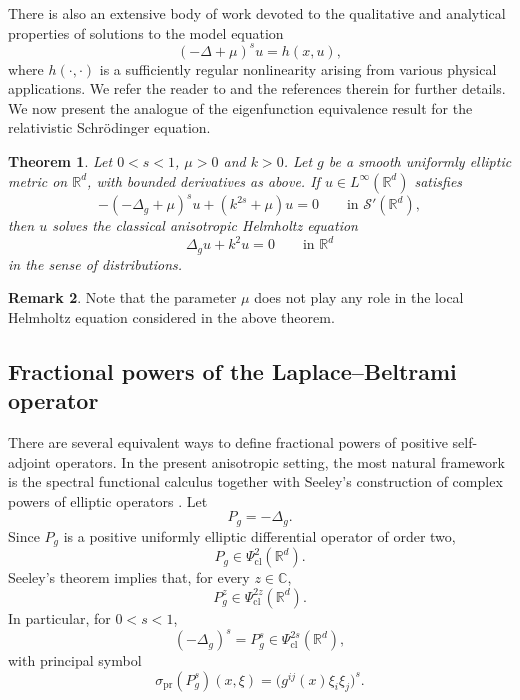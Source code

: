 \documentclass[12pt]{amsart}
\numberwithin{equation}{section}
\newtheorem{thm}{Theorem}[section]
\theoremstyle{definition}
\newtheorem{rem}[thm]{Remark}
\theoremstyle{remark}
\numberwithin{equation}{section}
\newcommand{\R}{{\mathbb R}}
\begin{document}
	There is also an extensive body of work devoted to the qualitative and analytical properties of solutions to the model equation
	\[
	(-\Delta + \mu)^s u = h(x,u),
	\]
	where $h(\cdot,\cdot)$ is a sufficiently regular nonlinearity arising from various physical applications. We refer the reader to \cite{ambrosio2022fractional, ambrosio2024concentration, byczkowski2009bessel, zelati2011existence, felmer2015scalar, ikoma2017existence} and the references therein for further details. We now present the analogue of the eigenfunction equivalence result for the relativistic Schr\"odinger equation.
	\begin{thm}\label{equivalence result, relativistic}
		Let $0<s<1$, $\mu>0$ and $k>0$. Let $g$ be a smooth uniformly elliptic metric on
		$\mathbb{R}^d$, with bounded derivatives as above. If
		$u\in L^{\infty}(\mathbb{R}^d)$ satisfies
		\[
		-(-\Delta_g+\mu)^s u+(k^{2s}+\mu)u=0
		\qquad \text{in } \mathcal{S}'(\R^d),
		\]
		then $u$ solves the classical anisotropic Helmholtz equation
		\[
		\Delta_g u+k^2u=0
		\qquad \text{in }\R^d
		\]
		in the sense of distributions.
	\end{thm}
	\begin{rem}
		Note that the parameter $\mu$ does not play any role in the local Helmholtz equation considered in the above theorem.
	\end{rem}
	
	
	
	
	
	
	\subsection{Fractional powers of the Laplace--Beltrami operator}
	
	There are several equivalent ways to define fractional powers of positive self-adjoint operators.
	In the present anisotropic setting, the most natural framework is the spectral functional calculus
	together with Seeley's construction of complex powers of elliptic operators \cite{Seeley1967}.
	Let
	\[
	P_g=-\Delta_g.
	\]
	Since \(P_g\) is a positive uniformly elliptic differential operator of order two,
	\[
	P_g\in \Psi^2_{\mathrm{cl}}(\mathbb R^d).
	\]
	Seeley's theorem implies that, for every \(z\in\mathbb C\),
	\[
	P_g^z\in \Psi^{2z}_{\mathrm{cl}}(\mathbb R^d).
	\]
	In particular, for \(0<s<1\),
	\[
	(-\Delta_g)^s=P_g^s\in \Psi^{2s}_{\mathrm{cl}}(\mathbb R^d),
	\]
	with principal symbol
	\[
	\sigma_{\mathrm{pr}}(P_g^s)(x,\xi)
	=
	\bigl(g^{ij}(x)\xi_i\xi_j\bigr)^s.
	\]
	
\end{document}
